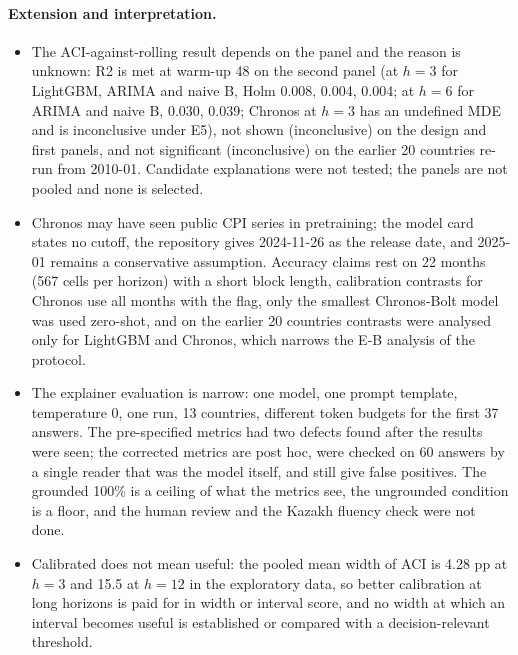 \paragraph{Extension and interpretation.}
\begin{itemize}
\item[(16)] The ACI-against-rolling result depends on the panel and the reason is unknown: R2 is met at warm-up 48 on the second panel (at $h=3$ for LightGBM, ARIMA and naive B, Holm 0.008, 0.004, 0.004; at $h=6$ for ARIMA and naive B, 0.030, 0.039; Chronos at $h=3$ has an undefined MDE and is inconclusive under E5), not shown (inconclusive) on the design and first panels, and not significant (inconclusive) on the earlier 20 countries re-run from 2010-01. Candidate explanations were not tested; the panels are not pooled and none is selected.
\item[(18)] Chronos may have seen public CPI series in pretraining; the model card \citep{amazon2024chronosbolt} states no cutoff, the repository gives 2024-11-26 as the release date, and 2025-01 remains a conservative assumption. Accuracy claims rest on 22 months (567 cells per horizon) with a short block length, calibration contrasts for Chronos use all months with the flag, only the smallest Chronos-Bolt model was used zero-shot, and on the earlier 20 countries contrasts were analysed only for LightGBM and Chronos, which narrows the E-B analysis of the protocol.
\item[(19)] The explainer evaluation is narrow: one model, one prompt template, temperature 0, one run, 13 countries, different token budgets for the first 37 answers. The pre-specified metrics had two defects found after the results were seen; the corrected metrics are post hoc, were checked on 60 answers by a single reader that was the model itself, and still give false positives. The grounded 100\% is a ceiling of what the metrics see, the ungrounded condition is a floor, and the human review and the Kazakh fluency check were not done.
\item[(21)] Calibrated does not mean useful: the pooled mean width of ACI is 4.28 pp at $h=3$ and 15.5 at $h=12$ in the exploratory data, so better calibration at long horizons is paid for in width or interval score, and no width at which an interval becomes useful is established or compared with a decision-relevant threshold.
\end{itemize}

